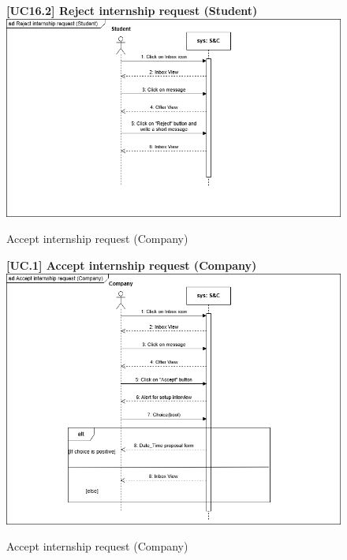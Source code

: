 \begin{figure}[H]
\textbf{[UC16.2] Reject internship request (Student)}\newline\newline
\includegraphics[width=15cm]{Images/UC_diagram/RASD-UC16.drawio.png}
    \caption{Accept internship request (Company)}
\end{figure}

\begin{figure}[H]
\textbf{[UC\nextUCDiagr.1] Accept internship request (Company)}\newline\newline
\includegraphics[width=15cm]{Images/UC_diagram/RASD-UC15.drawio.png}
    \caption{Accept internship request (Company)}
\end{figure}

